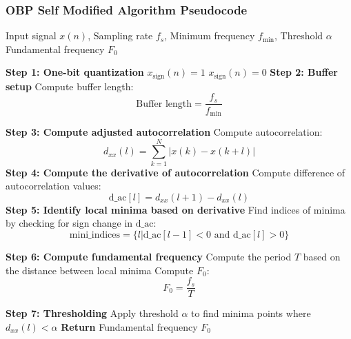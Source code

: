 \documentclass{ieeeaccess}
\begin{document}
\subsubsection{OBP Self Modified Algorithm Pseudocode}
\begin{algorithmic}[1]
\vspace{5pt} \hline \vspace{5pt}
\REQUIRE Input signal $x(n)$, Sampling rate $f_s$, Minimum frequency $f_{\text{min}}$, Threshold $\alpha$
\vspace{5pt} \hline \vspace{5pt}
\ENSURE Fundamental frequency $F_0$

\STATE \textbf{Step 1: One-bit quantization}
        \STATE $x_{\text{sign}}(n) = 1$
    \ELSE
        \STATE $x_{\text{sign}}(n) = 0$
    \ENDIF
\ENDFOR
\STATE \textbf{Step 2: Buffer setup}
\STATE Compute buffer length: 
$$
\text{Buffer length} = \frac{f_s}{f_{\text{min}}}
$$

\STATE \textbf{Step 3: Compute adjusted autocorrelation}
    \STATE Compute autocorrelation:
    $$ 
    d_{xx}(l) = \sum_{k=1}^{N} |x(k) - x(k+l)|
    $$
\ENDFOR
\STATE \textbf{Step 4: Compute the derivative of autocorrelation}
    \STATE Compute difference of autocorrelation values:
    $$ 
    \text{d\_ac}[l] = d_{xx}(l+1) - d_{xx}(l)
    $$
\ENDFOR
\STATE \textbf{Step 5: Identify local minima based on derivative}
\STATE Find indices of minima by checking for sign change in $\text{d\_ac}$:
$$
\text{mini\_indices} = \{ l | \text{d\_ac}[l-1] < 0 \text{ and } \text{d\_ac}[l] > 0 \}
$$

\STATE \textbf{Step 6: Compute fundamental frequency}
\STATE Compute the period $T$ based on the distance between local minima
\STATE Compute $F_0$:
$$
F_0 = \frac{f_s}{T}
$$

\STATE \textbf{Step 7: Thresholding}
\STATE Apply threshold $\alpha$ to find minima points where $d_{xx}(l) < \alpha$
\STATE \textbf{Return} Fundamental frequency $F_0$
\vspace{5pt} \hline \vspace{5pt}
\end{algorithmic}
\end{document}
